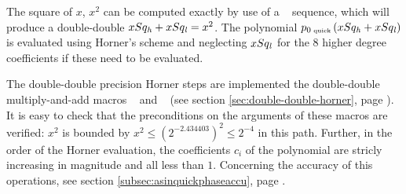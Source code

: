 The square of $x$, $x^2$ can be computed exactly by use of a \Mul~
sequence, which will produce a double-double $xSq_{\mathit{h}} + xSq_{\mathit{l}} =
x^2$. The polynomial $p_{0\mbox{\tiny ~quick}}\left( xSq_{\mathit{h}} + xSq_{\mathit{l}}
\right)$ is evaluated using Horner's scheme and neglecting $xSq_{\mathit{l}}$
for the $8$ higher degree coefficients if these need to be evaluated.

The double-double precision Horner steps are implemented the
double-double multiply-and-add macros \MulAddDD~ and \MulAddDdD~ (see
section \ref{sec:double-double-horner}, page
\pageref{sec:double-double-horner}). It is easy to check that the
preconditions on the arguments of these macros are verified: $x^2$ is
bounded by $x^2 \leq \left(2^{-2.434403}\right)^2 \leq 2^{-4}$ in this
path. Further, in the order of the Horner evaluation, the coefficients
$c_i$ of the polynomial are stricly increasing in magnitude and all
less than $1$.  Concerning the accuracy of this operations, see
section \ref{subsec:asinquickphaseaccu}, page
\pageref{subsec:asinquickphaseaccu}.

